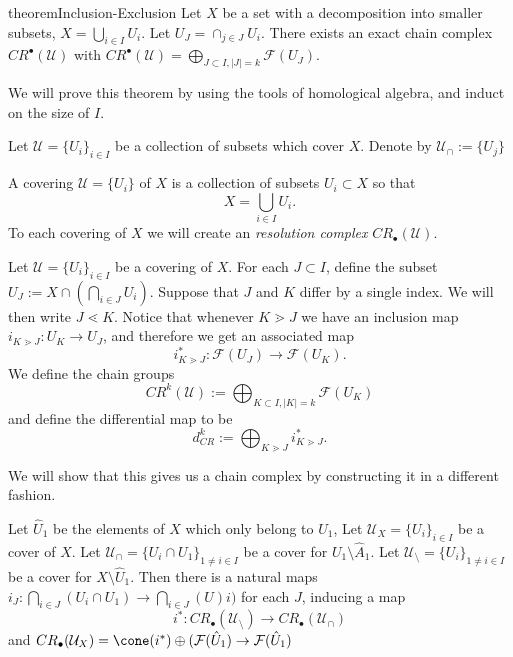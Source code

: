 
\begin{doubledpage}{theorem}{Inclusion-Exclusion}{
	Let $X$ be a set with a decomposition into smaller subsets, $X=\bigcup_{i\in I} U_i$. Let $U_J=\cap_{j\in J} U_i$. There exists an exact chain complex $CR^\bullet(\mathcal U)$ with $CR^\bullet(\mathcal U)=\bigoplus_{J\subset I, |J|=k} \mathcal F(U_J)$. }
	
\[
	
\]
We will prove this theorem by using the tools of homological algebra, and induct on the size of $I$. 
\begin{definition}
	Let $\mathcal U=\{U_i\}_{i\in I}$ be a collection of subsets which cover $X$. Denote by 
	$\mathcal U_{\cap}:= \{U_j\}_{}$
\end{definition}

A covering $\mathcal U=\{U_i\}$ of $X$  is a collection of subsets $U_i\subset X$ so that  \[X=\bigcup_{i\in I} U_i.\]
To each covering of $X$ we will create an \emph{resolution complex} $CR_\bullet(\mathcal U)$.
\begin{definition}
Let $\mathcal U=\{U_i\}_{i\in I}$ be a covering of $X$. For each $J\subset I$, define the subset $U_J:=X\cap (\bigcap_{i\in J} U_i)$.
Suppose that $J$ and $K$ differ by a single index. We will then write $J\lessdot K$. Notice that whenever $K\gtrdot J$ we have an inclusion map $i_{K\gtrdot J}:U_K\to U_J$, and therefore we get an associated map 
\[i_{K\gtrdot J}^*: \mathcal F (U_J)\to \mathcal F(U_K).\]
We define the chain groups 
\[CR^k(\mathcal U):=\bigoplus_{K\subset I, |K|=k} \mathcal F(U_K)\]
and define the differential map to be
\[d^k_{CR}:=\bigoplus_{K\gtrdot J} i_{K\gtrdot J}^*.\]
\end{definition}
We will show that this gives us a chain complex by constructing it in a different fashion. 

\begin{lemma}
	Let $\hat U_1$ be the elements of $X$ which only belong to $U_1$,   Let $\mathcal U_X=\{U_i\}_{i\in I}$ be a cover of $X$. Let $\mathcal U_{\cap}=\{U_i\cap U_1\}_{1\neq i\in I} $ be a cover for $U_1\setminus \hat A_1$. Let $\mathcal U_{\setminus}=\{U_i\}_{1\neq i\in I}$ be a cover for $X \setminus \hat U_1$.
	 Then there is a natural maps $i_{J}: \bigcap_{i\in J}(U_i\cap U_1 )\to \bigcap_{i\in J}(U)i)$ for each $J$, inducing a map 
	\[i^*: CR_\bullet(\mathcal U_\setminus)\to CR_\bullet(\mathcal U_\cap)\]
	and $CR_\bullet(\mathcal U_X)=\cone(i^*)\oplus (\mathcal F(\hat U_1)\to \mathcal F(\hat U_1)$
\end{lemma}


\end{doubledpage}
